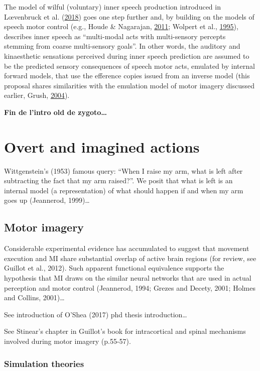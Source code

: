\documentclass[a4paper,12pt,twoside,openright,oldfontcommands]{memoir}
\begin{document}
The model of wilful (voluntary) inner speech production introduced in
Lœvenbruck et al.
(\protect\hyperlink{ref-loevenbruck_cognitive_2018}{2018}) goes one step
further and, by building on the models of speech motor control (e.g.,
Houde \& Nagarajan, \protect\hyperlink{ref-houde_speech_2011}{2011};
Wolpert et al., \protect\hyperlink{ref-wolpert_internal_1995}{1995}),
describes inner speech as ``multi-modal acts with multi-sensory percepts
stemming from coarse multi-sensory goals''. In other words, the auditory
and kinaesthetic sensations perceived during inner speech prediction are
assumed to be the predicted sensory consequences of speech motor acts,
emulated by internal forward models, that use the efference copies
issued from an inverse model (this proposal shares similarities with the
emulation model of motor imagery discussed earlier, Grush,
\protect\hyperlink{ref-grush_emulation_2004}{2004}).

\textbf{Fin de l'intro old de zygoto\ldots{}}

\section{Overt and imagined actions}\label{overt-and-imagined-actions}

Wittgenstein's (1953) famous query: ``When I raise my arm, what is left
after subtracting the fact that my arm raised?''. We posit that what is
left is an internal model (a representation) of what should happen if
and when my arm goes up (Jeannerod, 1999)\ldots{}

\subsection{Motor imagery}\label{motor-imagery}

Considerable experimental evidence has accumulated to suggest that
movement execution and MI share substantial overlap of active brain
regions (for review, see Guillot et al., 2012). Such apparent functional
equivalence supports the hypothesis that MI draws on the similar neural
networks that are used in actual perception and motor control
(Jeannerod, 1994; Grezes and Decety, 2001; Holmes and Collins,
2001)\ldots{}

See introduction of O'Shea (2017) phd thesis introduction\ldots{}

See Stinear's chapter in Guillot's book for intracortical and spinal
mechanisms involved during motor imagery (p.55-57).

\subsubsection{Simulation theories}\label{simulation-theories}
\end{document}
